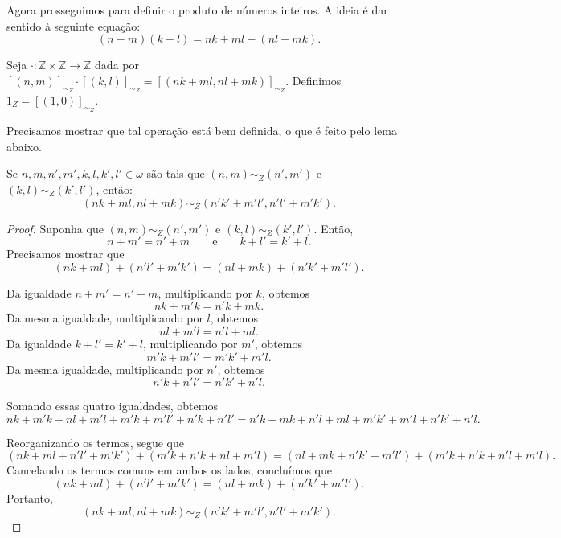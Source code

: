 Agora prosseguimos para definir o produto de números inteiros.
A ideia é dar sentido à seguinte equação:
\[
    (n-m)(k-l)=nk+ml-(nl+mk).
\]
\begin{definition}
    Seja $\cdot:\mathbb Z\times \mathbb Z\to \mathbb Z$ dada por $[(n, m)]_{\sim_Z}\cdot [(k, l)]_{\sim_Z}=[(nk+ml, nl+mk)]_{\sim_Z}$.
    Definimos $1_Z=[(1, 0)]_{\sim_Z}$.
\end{definition}
Precisamos mostrar que tal operação está bem definida, o que é feito pelo lema abaixo.
\begin{lemma}[$Z^-$]\label{lem:operacaoProdutoNosInteirosBemDefinida}
    Se $n, m, n', m', k, l, k', l' \in \omega$ são tais que $(n, m)\sim_Z (n', m')$ e $(k, l)\sim_Z (k', l')$, então:
    \[
        (nk+ml, nl+mk)\sim_Z (n'k'+m'l', n'l'+m'k').
    \]
\end{lemma}
\begin{proof}
    Suponha que $(n, m)\sim_Z (n', m')$ e $(k, l)\sim_Z (k', l')$.
    Então,
    \[
        n+m'=n'+m
        \qquad\text{e}\qquad
        k+l'=k'+l.
    \]
    Precisamos mostrar que
    \[
        (nk+ml)+(n'l'+m'k')=(nl+mk)+(n'k'+m'l').
    \]

    Da igualdade $n+m'=n'+m$, multiplicando por $k$, obtemos
    \[
        nk+m'k=n'k+mk.
    \]
    Da mesma igualdade, multiplicando por $l$, obtemos
    \[
        nl+m'l=n'l+ml.
    \]
    Da igualdade $k+l'=k'+l$, multiplicando por $m'$, obtemos
    \[
        m'k+m'l'=m'k'+m'l.
    \]
    Da mesma igualdade, multiplicando por $n'$, obtemos
    \[
        n'k+n'l'=n'k'+n'l.
    \]

    Somando essas quatro igualdades, obtemos
    \[
        nk+m'k+nl+m'l+m'k+m'l'+n'k+n'l'
        =
        n'k+mk+n'l+ml+m'k'+m'l+n'k'+n'l.
    \]

    Reorganizando os termos, segue que
    \[
        (nk+ml+n'l'+m'k')+(m'k+n'k+nl+m'l)
        =
        (nl+mk+n'k'+m'l')+(m'k+n'k+n'l+m'l).
    \]
    Cancelando os termos comuns em ambos os lados, concluímos que
    \[
        (nk+ml)+(n'l'+m'k')=(nl+mk)+(n'k'+m'l').
    \]
    Portanto,
    \[
        (nk+ml, nl+mk)\sim_Z (n'k'+m'l', n'l'+m'k').
    \]
\end{proof}

